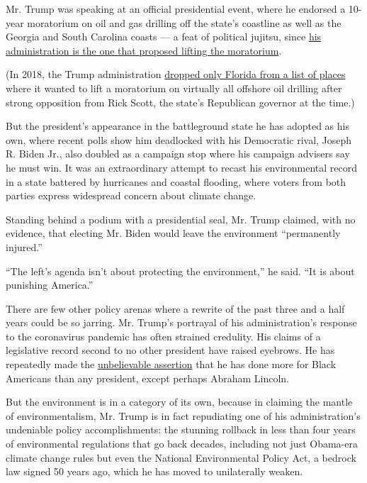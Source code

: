 Mr. Trump was speaking at an official presidential event, where he
endorsed a 10-year moratorium on oil and gas drilling off the state's
coastline as well as the Georgia and South Carolina coasts --- a feat of
political jujitsu, since
\href{https://www.nytimes3xbfgragh.onion/2018/01/04/climate/trump-offshore-drilling.html}{his
administration is the one that proposed lifting the moratorium}.

(In 2018, the Trump administration
\href{https://www.nytimes3xbfgragh.onion/2018/01/09/climate/trump-florida-offshore-drilling.html}{dropped
only Florida from a list of places} where it wanted to lift a moratorium
on virtually all offshore oil drilling after strong opposition from Rick
Scott, the state's Republican governor at the time.)

But the president's appearance in the battleground state he has adopted
as his own, where recent polls show him deadlocked with his Democratic
rival, Joseph R. Biden Jr., also doubled as a campaign stop where his
campaign advisers say he must win. It was an extraordinary attempt to
recast his environmental record in a state battered by hurricanes and
coastal flooding, where voters from both parties express widespread
concern about climate change.

Standing behind a podium with a presidential seal, Mr. Trump claimed,
with no evidence, that electing Mr. Biden would leave the environment
``permanently injured.''

``The left's agenda isn't about protecting the environment,'' he said.
``It is about punishing America.''

There are few other policy arenas where a rewrite of the past three and
a half years could be so jarring. Mr. Trump's portrayal of his
administration's response to the coronavirus pandemic has often strained
credulity. His claims of a legislative record second to no other
president have raised eyebrows. He has repeatedly made the
\href{https://www.nytimes3xbfgragh.onion/2020/06/05/us/politics/trump-black-african-americans-fact-check.html}{unbelievable
assertion} that he has done more for Black Americans than any president,
except perhaps Abraham Lincoln.

But the environment is in a category of its own, because in claiming the
mantle of environmentalism, Mr. Trump is in fact repudiating one of his
administration's undeniable policy accomplishments: the stunning
rollback in less than four years of environmental regulations that go
back decades, including not just Obama-era climate change rules but even
the National Environmental Policy Act, a bedrock law signed 50 years
ago, which he has moved to unilaterally weaken.

